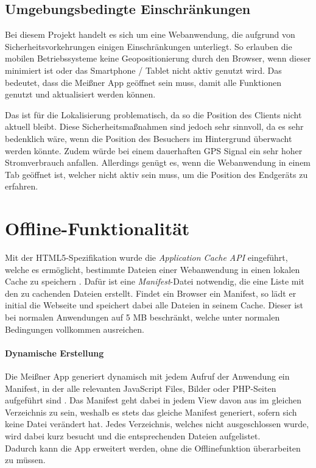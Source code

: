 \subsection{Umgebungsbedingte Einschränkungen}
Bei diesem Projekt handelt es sich um eine Webanwendung, die aufgrund von Sicherheitsvorkehrungen einigen Einschränkungen unterliegt. So erlauben die mobilen Betriebssysteme keine Geopositionierung durch den Browser, wenn dieser minimiert ist oder das Smartphone / Tablet nicht aktiv genutzt wird. Das bedeutet, dass die Meißner App geöffnet sein muss, damit alle Funktionen genutzt und aktualisiert werden können.\par

Das ist für die Lokalisierung problematisch, da so die Position des Clients nicht aktuell bleibt. Diese Sicherheitsmaßnahmen sind jedoch sehr sinnvoll, da es sehr bedenklich wäre, wenn die Position des Besuchers im Hintergrund überwacht werden könnte. Zudem würde bei einem dauerhaften GPS Signal ein sehr hoher Stromverbrauch anfallen. Allerdings genügt es, wenn die Webanwendung in einem Tab geöffnet ist, welcher nicht aktiv sein muss, um die Position des Endgeräts zu erfahren.


\section{Offline-Funktionalität}
Mit der HTML5-Spezifikation wurde die \emph{Application Cache API} eingeführt, welche es ermöglicht, bestimmte Dateien einer Webanwendung in einen lokalen Cache zu speichern \cite[S. 189f]{friberg2013web}. Dafür ist eine \emph{Manifest}-Datei notwendig, die eine Liste mit den zu cachenden Dateien erstellt. Findet ein Browser ein Manifest, so lädt er initial die Webseite und speichert dabei alle Dateien in seinem Cache. Dieser ist bei normalen Anwendungen auf 5 MB beschränkt, welche unter normalen Bedingungen vollkommen ausreichen.\par

\paragraph{Dynamische Erstellung}
Die Meißner App generiert dynamisch mit jedem Aufruf der Anwendung ein Manifest, in der alle relevanten JavaScript Files, Bilder oder PHP-Seiten aufgeführt sind \cite{dynamic:manifest}. Das Manifest geht dabei in jedem View davon aus im gleichen Verzeichnis zu sein, weshalb es stets das gleiche Manifest generiert, sofern sich keine Datei verändert hat. Jedes Verzeichnis, welches nicht ausgeschlossen wurde, wird dabei kurz besucht und die entsprechenden Dateien aufgelistet.\\
Dadurch kann die App erweitert werden, ohne die Offlinefunktion überarbeiten zu müssen.

